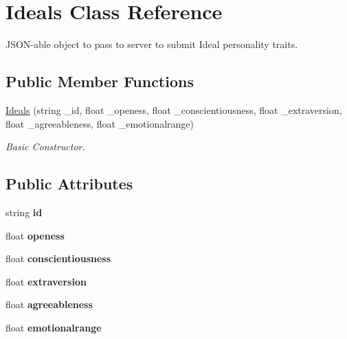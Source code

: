 \hypertarget{class_ideals}{}\section{Ideals Class Reference}
\label{class_ideals}


J\+S\+O\+N-\/able object to pass to server to submit Ideal personality traits.  


\subsection*{Public Member Functions}
\begin{DoxyCompactItemize}
\item 
\mbox{\label{class_ideals_abd4643b2fa3716e9481f924e5bf5fff3}} 
\mbox{\hyperlink{class_ideals_abd4643b2fa3716e9481f924e5bf5fff3}{Ideals}} (string \+\_\+id, float \+\_\+openess, float \+\_\+conscientiousness, float \+\_\+extraversion, float \+\_\+agreeableness, float \+\_\+emotionalrange)
\begin{DoxyCompactList}\small\item\em Basic Constructor. \end{DoxyCompactList}\end{DoxyCompactItemize}
\subsection*{Public Attributes}
\begin{DoxyCompactItemize}
\item 
\mbox{\label{class_ideals_a29f7b5096a6864440086554867f3e12c}} 
string {\bfseries id}
\item 
\mbox{\label{class_ideals_a648763f2b5d91dda9358164ee1756274}} 
float {\bfseries openess}
\item 
\mbox{\label{class_ideals_ab111253ba1026e09b2a87b2b0accaee8}} 
float {\bfseries conscientiousness}
\item 
\mbox{\label{class_ideals_ad5b55c25cbf73153ea017d8ed3c708b2}} 
float {\bfseries extraversion}
\item 
\mbox{\label{class_ideals_a392c9c4d471c383b7ed47eab5eff54ce}} 
float {\bfseries agreeableness}
\item 
\mbox{\label{class_ideals_aaa63cb593d1e86816d23ee6321d59427}} 
float {\bfseries emotionalrange}
\end{DoxyCompactItemize}


